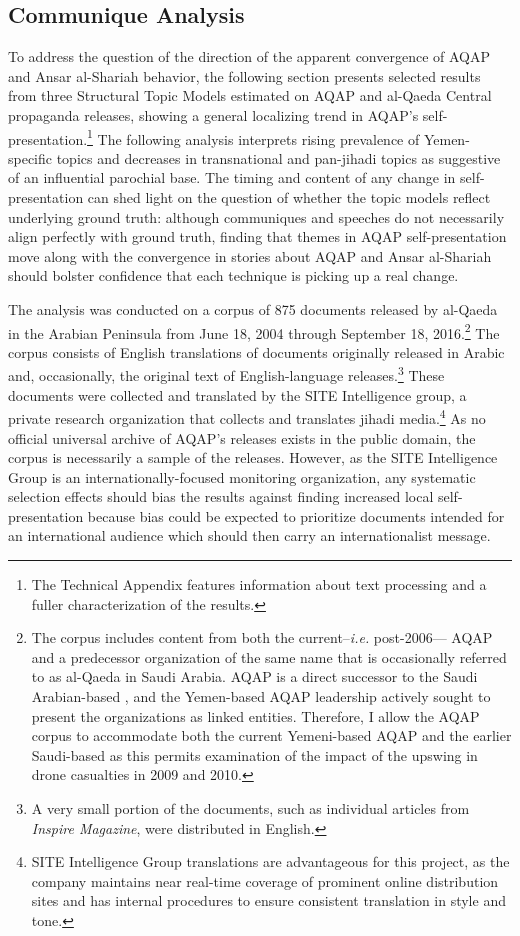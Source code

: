 \subsection{Communique Analysis}
\label{sec:communiques}
To address the question of the direction of the apparent convergence of
AQAP and Ansar al-Shariah behavior, the following section presents
selected results from three Structural Topic Models estimated on AQAP
and al-Qaeda Central propaganda releases, showing a general
localizing trend in AQAP's self-presentation.\footnote{The Technical Appendix
  features information about text processing and a fuller
  characterization of the results.} The following analysis interprets rising prevalence of Yemen-specific topics and decreases in transnational and pan-jihadi topics as suggestive of an influential parochial base. The timing and content of any change in self-presentation can shed light on the question of whether the topic models reflect underlying ground truth: although communiques and speeches do not necessarily align perfectly with ground truth, finding that themes in AQAP self-presentation move along with the convergence in stories about AQAP and Ansar al-Shariah should bolster confidence that each technique is picking up a real change.

The analysis was conducted on a corpus of 875 documents released by al-Qaeda in the Arabian Peninsula from June 18, 2004 through September 18, 2016.\footnote{The corpus includes content from both the current--\textit{i.e.} post-2006--- AQAP and a predecessor organization of the same name that is occasionally referred to as al-Qaeda in Saudi Arabia.  AQAP is a direct successor to the Saudi Arabian-based , and the Yemen-based AQAP leadership actively sought to present the organizations as linked entities. Therefore, I allow the AQAP corpus to accommodate both the current Yemeni-based AQAP and the earlier Saudi-based  as this permits examination of the impact of the upswing in drone casualties in 2009 and 2010.} The corpus consists of English translations of documents originally released in Arabic and, occasionally, the original text of English-language releases.\footnote{A very small portion of the
  documents, such as individual articles from \textit{Inspire Magazine}, were distributed in English.} These documents were collected and translated by the SITE Intelligence group, a private research organization that collects and translates jihadi media.\footnote{SITE Intelligence Group translations are advantageous for this project, as the company maintains near real-time coverage of prominent online distribution sites and has internal procedures to ensure consistent translation in style and tone.} As no official universal archive of AQAP's releases exists in the public domain,  the corpus is necessarily a sample of the releases. However, as the SITE Intelligence Group is an internationally-focused monitoring
  organization, any systematic selection effects should bias the results against finding increased local self-presentation because bias could be expected to prioritize documents intended for an international audience which should then carry an internationalist message.
  
